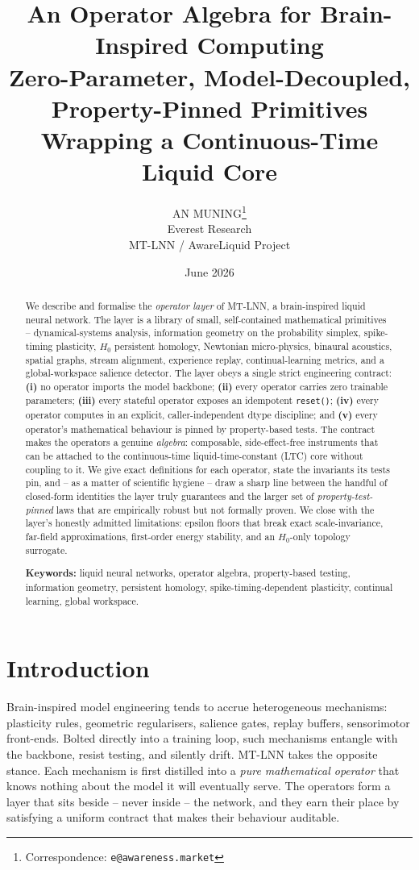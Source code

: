 \documentclass[11pt]{article}
\title{\textbf{An Operator Algebra for Brain-Inspired Computing}\\[2mm]
\large Zero-Parameter, Model-Decoupled, Property-Pinned Primitives\\
Wrapping a Continuous-Time Liquid Core}
\author{AN MUNING\thanks{Correspondence: \texttt{e@awareness.market}}\\
Everest Research\\
MT-LNN / AwareLiquid Project}
\date{June 2026}
\theoremstyle{definition}
\newcommand{\code}[1]{\texttt{#1}}
\begin{document}
\maketitle

\begin{abstract}
We describe and formalise the \emph{operator layer} of MT-LNN, a
brain-inspired liquid neural network. The layer is a library of small,
self-contained mathematical primitives -- dynamical-systems analysis,
information geometry on the probability simplex, spike-timing plasticity,
$H_0$ persistent homology, Newtonian micro-physics, binaural acoustics,
spatial graphs, stream alignment, experience replay, continual-learning
metrics, and a global-workspace salience detector. The layer obeys a single
strict engineering contract: \textbf{(i)} no operator imports the model
backbone; \textbf{(ii)} every operator carries zero trainable parameters;
\textbf{(iii)} every stateful operator exposes an idempotent \code{reset()};
\textbf{(iv)} every operator computes in an explicit, caller-independent
dtype discipline; and \textbf{(v)} every operator's mathematical behaviour
is pinned by property-based tests. The contract makes the operators a
genuine \emph{algebra}: composable, side-effect-free instruments that can be
attached to the continuous-time liquid-time-constant (LTC) core without
coupling to it. We give exact definitions for each operator, state the
invariants its tests pin, and -- as a matter of scientific hygiene -- draw a
sharp line between the handful of closed-form identities the layer truly
guarantees and the larger set of \emph{property-test-pinned} laws that are
empirically robust but not formally proven. We close with the layer's
honestly admitted limitations: epsilon floors that break exact
scale-invariance, far-field approximations, first-order energy stability,
and an $H_0$-only topology surrogate.
\par\smallskip
\noindent\textbf{Keywords:} liquid neural networks, operator algebra,
property-based testing, information geometry, persistent homology,
spike-timing-dependent plasticity, continual learning, global workspace.
\end{abstract}

\section{Introduction}
Brain-inspired model engineering tends to accrue heterogeneous mechanisms:
plasticity rules, geometric regularisers, salience gates, replay buffers,
sensorimotor front-ends. Bolted directly into a training loop, such
mechanisms entangle with the backbone, resist testing, and silently drift.
MT-LNN takes the opposite stance. Each mechanism is first distilled into a
\emph{pure mathematical operator} that knows nothing about the model it will
eventually serve. The operators form a layer that sits beside -- never
inside -- the network, and they earn their place by satisfying a uniform
contract that makes their behaviour auditable.
\end{document}
